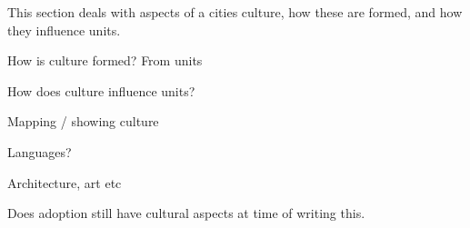 

This section deals with aspects of a cities culture, how these are formed, and how they influence units.

How is culture formed?
 From units

How does culture influence units?

Mapping / showing culture

Languages?

Architecture, art etc 


Does adoption still have cultural aspects at time of writing this.
